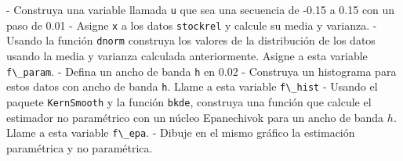 \documentclass[
  12pt,
]{book}
\newenvironment{Shaded}{\begin{snugshade}}{\end{snugshade}}
\newcommand{\CommentTok}[1]{\textcolor[rgb]{0.56,0.35,0.01}{\textit{#1}}}
\newcommand{\ControlFlowTok}[1]{\textcolor[rgb]{0.13,0.29,0.53}{\textbf{#1}}}
\newcommand{\DataTypeTok}[1]{\textcolor[rgb]{0.13,0.29,0.53}{#1}}
\newcommand{\DecValTok}[1]{\textcolor[rgb]{0.00,0.00,0.81}{#1}}
\newcommand{\FloatTok}[1]{\textcolor[rgb]{0.00,0.00,0.81}{#1}}
\newcommand{\KeywordTok}[1]{\textcolor[rgb]{0.13,0.29,0.53}{\textbf{#1}}}
\newcommand{\NormalTok}[1]{#1}
\newcommand{\OperatorTok}[1]{\textcolor[rgb]{0.81,0.36,0.00}{\textbf{#1}}}
\newcommand{\StringTok}[1]{\textcolor[rgb]{0.31,0.60,0.02}{#1}}
\theoremstyle{definition}
\theoremstyle{definition}
\theoremstyle{definition}
\theoremstyle{remark}
\let\BeginKnitrBlock\begin \let\EndKnitrBlock\end
\begin{document}
\begin{Shaded}
\end{Shaded}

\BeginKnitrBlock{remark}
{}
- Construya una variable llamada \texttt{u} que sea una secuencia de -0.15 a 0.15 con un paso de 0.01
- Asigne \texttt{x} a los datos \texttt{stockrel} y calcule su media y varianza.
- Usando la función \texttt{dnorm} construya los valores de la distribución de los datos usando la media y varianza calculada anteriormente. Asigne a esta variable \texttt{f\textbackslash{}\_param}.
- Defina un ancho de banda \texttt{h} en 0.02
- Construya un histograma para estos datos con ancho de banda \texttt{h}. Llame a esta variable \texttt{f\textbackslash{}\_hist}
- Usando el paquete \texttt{KernSmooth} y la función \texttt{bkde}, construya una función que calcule el estimador no paramétrico con un núcleo Epanechivok para un ancho de banda \(h\). Llame a esta variable \texttt{f\textbackslash{}\_epa}.
- Dibuje en el mismo gráfico la estimación paramétrica y no paramétrica.
\EndKnitrBlock{remark}
\end{document}
